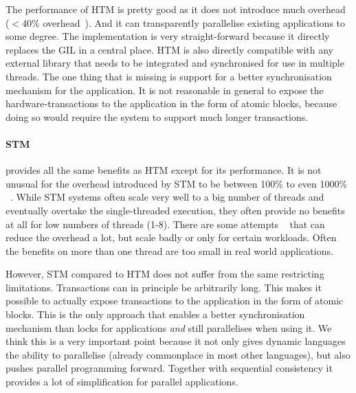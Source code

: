 \documentclass{sigplanconf}
\begin{document}
The performance of HTM is pretty good as it does not introduce much
overhead ($<40\%$ overhead~\cite{odaira14}). And it can transparently
parallelise existing applications to some degree. The implementation
is very straight-forward because it directly replaces the GIL in a
central place. HTM is also directly compatible with any external
library that needs to be integrated and synchronised for use in
multiple threads. The one thing that is missing is support for a
better synchronisation mechanism for the application. It is not
reasonable in general to expose the hardware-transactions to the
application in the form of atomic blocks, because doing so would
require the system to support much longer transactions.


\paragraph{STM} provides all the same benefits as HTM except for its
performance.  It is not unusual for the overhead introduced by STM to
be between 100\% to even 1000\% ~\cite{cascaval08,drago11}. While STM
systems often scale very well to a big number of threads and
eventually overtake the single-threaded execution, they often provide
no benefits at all for low numbers of threads (1-8). There are some
attempts ~\cite{warmhoff13,spear09} that can reduce the overhead a lot,
but scale badly or only for certain workloads. Often the benefits
on more than one thread are too small in real world applications.

However, STM compared to HTM does not suffer from the same restricting
limitations. Transactions can in principle be arbitrarily long.  This makes it
possible to actually expose transactions to the application in the
form of atomic blocks. This is the only approach that enables a better
synchronisation mechanism than locks for applications \emph{and} still
parallelises when using it. We think this is a very important point
because it not only gives dynamic languages the ability to parallelise
(already commonplace in most other languages), but also pushes
parallel programming forward. Together with sequential consistency it
provides a lot of simplification for parallel applications.
\end{document}
